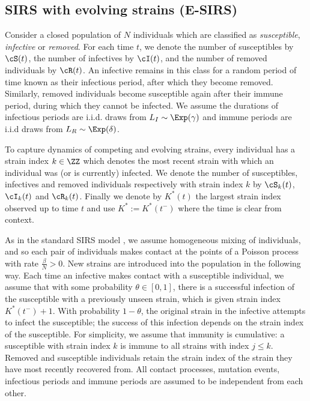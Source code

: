 \documentclass[review]{elsarticle}
\begin{document}
\subsection{SIRS with evolving strains (E-SIRS)}\label{subsec: sirs}
Consider a closed population of $N$ individuals which are classified as \emph{susceptible}, \emph{infective} or \emph{removed}. For each time $t$, we denote the number of susceptibles by $\cS(t)$, the number of infectives by $\cI(t)$, and the number of removed individuals by $\cR(t)$. An infective remains in this class for a random period of time known as their infectious period, after which they become removed. Similarly, removed individuals become susceptible again after their immune period, during which they cannot be infected.  We assume the durations of infectious periods are i.i.d. draws from $L_I \sim \Exp(\gamma)$ and immune periods are i.i.d draws from $L_R \sim \Exp(\delta)$.

To capture dynamics of competing and evolving strains, every individual has a strain index $k \in \ZZ$ which denotes the most recent strain with which an individual was (or is currently) infected. We denote the number of susceptibles, infectives and removed individuals respectively with strain index $k$ by $\cS_k(t)$, $\cI_k(t)$ and $\cR_k(t)$. Finally we denote by $K^*(t)$ the largest strain index observed up to time $t$ and use $K^* := K^*(t^-)$ where the time is clear from context.

As in the standard SIRS model \cite{nasell2002}, we assume homogeneous mixing of individuals, and so each pair of individuals makes contact at the points of a Poisson process with rate $\frac{\beta}{N} > 0$. New strains are introduced into the population in the following way. Each time an infective makes contact with a susceptible individual, we assume that with some probability $\theta \in [0,1]$, there is a successful infection of the susceptible with a previously unseen strain, which is given strain index $K^*(t^-)+1$. With probability $1-\theta$, the original strain in the infective attempts to infect the susceptible; the success of this infection depends on the strain index of the susceptible. For simplicity, we assume that immunity is cumulative: a susceptible with strain index $k$ is immune to all strains with index $j \leq k$. Removed and susceptible individuals retain the strain index of the strain they have most recently recovered from. All contact processes, mutation events, infectious periods and immune periods are assumed to be independent from each other.
	
\end{document}
